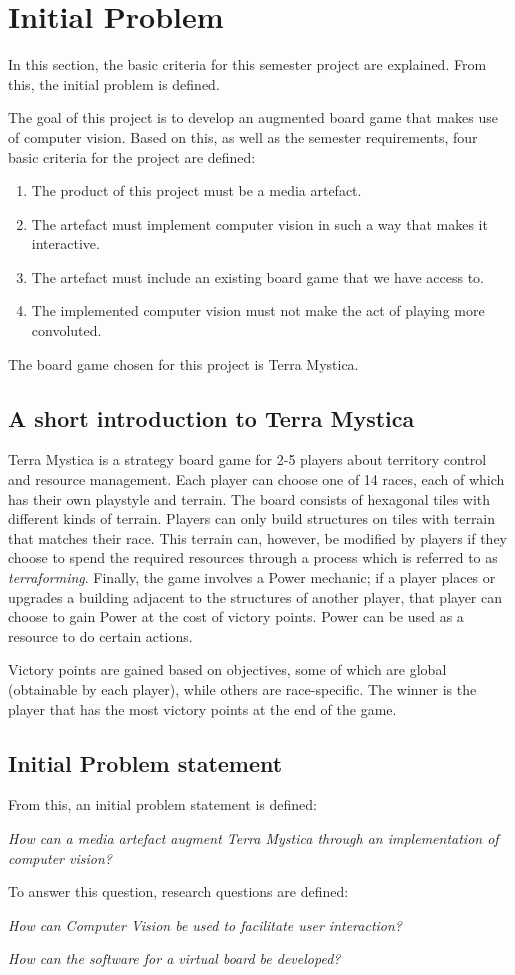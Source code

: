 \chapter{Initial Problem}\label{ch:iniprob}
In this section, the basic criteria for this semester project are explained. From this, the initial problem is defined.

The goal of this project is to develop an augmented board game that makes use of computer vision. Based on this, as well as the semester requirements, four basic criteria for the project are defined:

\begin{enumerate}
	\item The product of this project must be a media artefact.
	\item The artefact must implement computer vision in such a way that makes it interactive.
	\item The artefact must include an existing board game that we have access to.
	\item The implemented computer vision must not make the act of playing more convoluted.
\end{enumerate}

The board game chosen for this project is Terra Mystica.

\section{A short introduction to Terra Mystica}
Terra Mystica is a strategy board game for 2-5 players about territory control and resource management. Each player can choose one of 14 races, each of which has their own playstyle and terrain. The board consists of hexagonal tiles  with different kinds of terrain. Players can only build structures on tiles with terrain that matches their race. This terrain can, however, be modified by players if they choose to spend the required resources through a process which is referred to as \textit{terraforming}. Finally, the game involves a Power mechanic; if a player places or upgrades a building adjacent to the structures of another player, that player can choose to gain Power at the cost of victory points. Power can be used as a resource to do certain actions.

Victory points are gained based on objectives, some of which are global (obtainable by each player), while others are race-specific. The winner is the player that has the most victory points at the end of the game.

\section{Initial Problem statement}
From this, an initial problem statement is defined: 

\textit{How can a media artefact augment Terra Mystica through an implementation of computer vision?}

To answer this question, research questions are defined:

\textit{How can Computer Vision be used to facilitate user interaction?}

\textit{How can the software for a virtual board be developed?}

